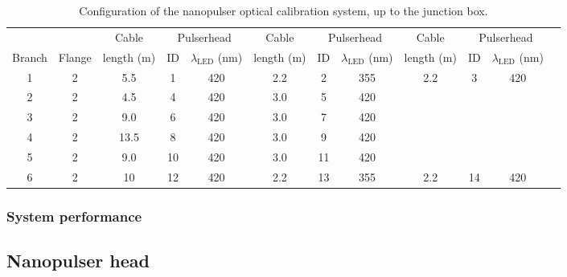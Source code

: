 \begin{table}[h!]
  \begin{center}
    \caption{Configuration of the \jsns nanopulser optical calibration system, up to the junction box.}
    \label{table:cable_configuration}
    \begin{tabular}{|c|c|c|c|c|c|c|c|c|c|c|c} 
	\hline
	 &  & Cable  & \multicolumn{2}{c|}{Pulserhead} &  Cable & \multicolumn{2}{c|}{Pulserhead} &  Cable & \multicolumn{2}{c|}{Pulserhead}\\ \cline{4-5} \cline{7-8} \cline{10-11}
	Branch & Flange & length (m) &  ID & $\lambda_{\mathrm{LED}}$ (nm) & length (m) &  ID & $\lambda_{\mathrm{LED}}$ (nm) & length (m) &  ID & $\lambda_{\mathrm{LED}}$ (nm) \\ \hline
	1 & 2 & 5.5   &  1 & 420 & 2.2 & 2 & 355 & 2.2 & 3 & 420 \\ 
	2 & 2 & 4.5   &  4 & 420 & 3.0 & 5 & 420 & & & \\ 
	3 & 2 & 9.0   &  6 & 420 & 3.0 & 7 & 420 & & & \\ 
	4 & 2 & 13.5 &  8 & 420 & 3.0 & 9 & 420 & & & \\ 
	5 & 2 & 9.0   & 10 & 420 & 3.0 & 11 & 420 & & & \\ 
	6 & 2 & 10    & 12 & 420 & 2.2 & 13 & 355 & 2.2 & 14 & 420 \\
	\hline
    \end{tabular}
  \end{center}
\end{table}


%
%

\subsubsection*{System performance}


\subsection*{Nanopulser head}

